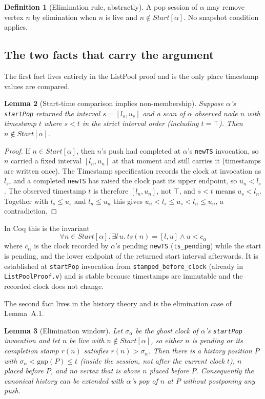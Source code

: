 \documentclass[11pt]{article}
\newtheorem{lemma}{Lemma}[section]
\theoremstyle{definition}
\newtheorem{definition}[lemma]{Definition}
\theoremstyle{remark}
\newcommand{\code}[1]{\texttt{#1}}
\newcommand{\file}[1]{\texttt{#1}}
\newcommand{\Start}{\mathit{Start}}
\newcommand{\sess}{\sigma}
\newcommand{\gap}{\mathrm{gap}}
\newcommand{\TSTop}{\top}
\begin{document}
\begin{definition}[Elimination rule, abstractly]
A pop session of $\alpha$ may remove vertex $n$ by elimination when $n$ is
live and $n \notin \Start[\alpha]$. No snapshot condition applies.
\end{definition}

\subsection{The two facts that carry the argument}

The first fact lives entirely in the ListPool proof and is the only place
timestamp values are compared.

\begin{lemma}[Start-time comparison implies non-membership]
\label{lem:ts}
Suppose $\alpha$'s \code{startPop} returned the interval $s=[l_s,u_s]$ and
a scan of $\alpha$ observed node $n$ with timestamp $t$ where
$s < t$ in the strict interval order (including $t=\TSTop$). Then
$n \notin \Start[\alpha]$.
\end{lemma}

\begin{proof}
If $n \in \Start[\alpha]$, then $n$'s push had completed at $\alpha$'s
\code{newTS} invocation, so $n$ carried a fixed interval $[l_n,u_n]$ at
that moment and still carries it (timestamps are written once). The
Timestamp specification records the clock at invocation as $l_s$, and a
completed \code{newTS} has raised the clock past its upper endpoint, so
$u_n < l_s$. The observed timestamp $t$ is therefore $[l_n,u_n]$, not
$\TSTop$, and $s < t$ means $u_s < l_n$. Together with $l_s \le u_s$ and
$l_n \le u_n$ this gives $u_n < l_s \le u_s < l_n \le u_n$, a contradiction.
\end{proof}

In Coq this is the invariant
\[
\forall n \in \Start[\alpha].\ \exists l\,u.\ \mathit{ts}(n) = [l,u] \wedge u < c_\alpha
\]
where $c_\alpha$ is the clock recorded by $\alpha$'s pending \code{newTS}
(\code{ts\_pending}) while the start is pending, and the lower endpoint
of the returned start interval afterwards. It is established at
\code{startPop} invocation from \code{stamped\_before\_clock} (already
in \file{ListPoolProof.v}) and is stable because timestamps are
immutable and the recorded clock does not change.

The second fact lives in the history theory and is the elimination case
of Lemma~A.1.

\begin{lemma}[Elimination window]
\label{lem:window}
Let $\sess_\alpha$ be the ghost clock of $\alpha$'s \code{startPop}
invocation and let $n$ be live with $n \notin \Start[\alpha]$, so either
$n$ is pending or its completion stamp $r(n)$ satisfies
$r(n) > \sess_\alpha$. Then there is a history position $P$ with
$\sess_\alpha < \gap(P) \le t$ (inside the session, not after the current
clock $t$), $n$ placed before $P$, and no vertex that is \emph{above} $n$
placed before $P$. Consequently the canonical history can be extended
with $\alpha$'s pop of $n$ at $P$ without postponing any push.
\end{lemma}
\end{document}
